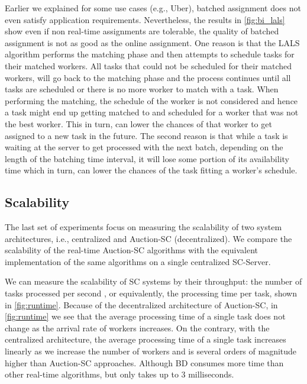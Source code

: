 Earlier we explained for some use cases (e.g., Uber), batched assignment does not even satisfy application requirements. Nevertheless, the results in \cref{fig:bi_lals} show even if non real-time assignments are tolerable, the quality of batched assignment is not as good as the online assignment. One reason is that the LALS algorithm performs the matching phase and then attempts to schedule tasks for their matched workers. All tasks that could not be scheduled for their matched workers, will go back to the matching phase and the process continues until all tasks are scheduled or there is no more worker to match with a task. When performing the matching, the schedule of the worker is not considered and hence a task might end up getting matched to and scheduled for a worker that was not the best worker. This in turn, can lower the chances of that worker to get assigned to a new task in the future. The second reason is that while a task is waiting at the server to get processed with the next batch, depending on the length of the batching time interval, it will lose some portion of its availability time which in turn, can lower the chances of the task fitting a worker's schedule.

\subsection{Scalability}
The last set of experiments focus on measuring the scalability of two system architectures, i.e., centralized and Auction-SC (decentralized). We compare the scalability of the real-time Auction-SC algorithms with the equivalent implementation of the same algorithms on a single centralized SC-Server. 

We can measure the scalability of SC systems by their throughput: the number of tasks processed per second , or equivalently, the processing time per task, shown in \cref{fig:runtime}. Because of the decentralized architecture of Auction-SC, in \cref{fig:runtime} we see that the average processing time of a single task does not change as the arrival rate of workers increases. On the contrary, with the centralized architecture, the average processing time of a single task increases linearly as we increase the number of workers and is several orders of magnitude higher than Auction-SC approaches. Although BD consumes more time than other real-time algorithms, but only takes up to 3 milliseconds.

